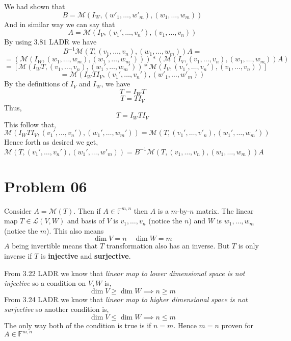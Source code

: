 \documentclass[letter]{article}
\begin{document}
We had shown that 
\[
B = \mathcal M (I_W, (w'_1, \ldots,  w'_m), (w_1, \ldots, w_m)) 
\]
And in similar way we can say that 
\[
A = \mathcal M 
\left(
I_V , 
(v_1', \ldots, v_n'), 
(v_1 ,\ldots, v_n)
\right)
\] 
By using $3.81$ LADR we have 
\[
B^{-1} \mathcal M 
(
T, 
(v_1, \ldots, v_n), 
(w_1, \ldots, w_m)
) A = \]\[= 
(\mathcal M 
\left(I_W, (w_1, \ldots, w_m), (w_1', \ldots, w_m')\right)
) * 
(\mathcal M 
\left(I_V, (v_1, \ldots, v_n), (w_1, \ldots, w_m)\right)
A)  
\] 
 \[
 = [ 
\mathcal M 
(
I_W T, 
\left(v_1 ,\ldots, v_n\right) , 
\left(w_1', \ldots, w_m'\right)
)
  * 
 \mathcal M 
\left(
	I_V, (v_1' ,\ldots, v_n'), 
	(v_1 ,\ldots, v_n)
\right) ]
 \] 
 \[
 = \mathcal M 
 \left(
I_W T I_V 
, 
(v_1',\ldots, v_n'), 
\left(w'_1 , \ldots, w'_m\right)
 \right)
 \] 
 By the definitions of $I_V$ and $I_W$, we have 
 \[
 T = I_W T 
 \]
 \[
 T = T I_V
 \]
 Thus,
 \[
 T = I_W T I_V
 \]
 This follow that, 
 \[
 \mathcal M 
 \left(
I_W T I_V , 
\left(v_1 ' ,\ldots, v_n'\right), 
\left(w_1' ,\ldots, w_m'\right)
 \right) 
 =
 \mathcal M 
 \left(
T, 
\left(v_1', \ldots, v'_n\right) , 
(w_1', \ldots, w_m')
 \right)
 \]
 Hence forth as desired we get,
 \[
 \mathcal M 
 \left(T,
	 (v_1', \ldots, v_n'), 
	 \left(w_1', \ldots, w'_m\right)
 \right) = 
 B^{-1} 
 \mathcal M
 \left(
T, 
(v_1, \ldots, v_n), 
\left(w_1 ,\ldots, w_m\right) 
 \right) A
 \] 
\section*{Problem 06}
Consider $A = \mathcal M (T)$. Then if $A \in \mathbb{F}^{m,n}$ then $A$ is a $m$-by-$n$ matrix. The linear map $ T \in \mathcal L (V,W)$ and basis of $V$ is $v_1 ,\ldots, v_n$ (notice the $n$) and $W$ is $w_1, \ldots, w_m$ (notice the $m$). This also means
\[
\dim V = n \quad \dim W = m
\]
$A$ being invertible means that $T$ transformation also has an inverse. But $T$ is only inverse if $T$ is \textbf{injective } and \textbf{surjective}.

From 3.22 LADR we know that \emph{linear map to lower dimensional space is not injective } so a condition on $V,W$ is,
\[
\dim V \ge \dim W \implies n \ge m
\]
From 3.24 LADR we know that \emph{linear map to higher dimensional space is not surjective} so another condition is, 
\[
\dim V \le \dim W \implies n \le m
\]
The only way both of the condition is true is if 
$n = m$. 
Hence $m = n$ proven for $A \in \mathbb{F}^{m,n}$
\end{document}
